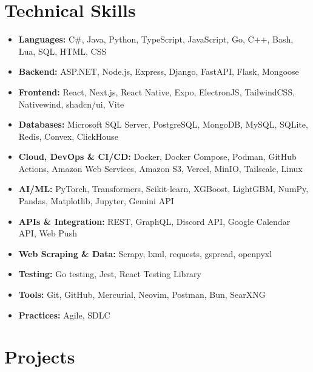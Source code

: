 \documentclass[a4paper,11pt]{article}
\begin{document}
\section*{Technical Skills}
\begin{itemize}
\item \textbf{Languages:} C\#, Java, Python, TypeScript, JavaScript, Go, C++, Bash, Lua, SQL, HTML, CSS
\item \textbf{Backend:} ASP.NET, Node.js, Express, Django, FastAPI, Flask, Mongoose
\item \textbf{Frontend:} React, Next.js, React Native, Expo, ElectronJS, TailwindCSS, Nativewind, shadcn/ui, Vite
\item \textbf{Databases:} Microsoft SQL Server, PostgreSQL, MongoDB, MySQL, SQLite, Redis, Convex, ClickHouse
\item \textbf{Cloud, DevOps \& CI/CD:} Docker, Docker Compose, Podman, GitHub Actions, Amazon Web Services, Amazon S3, Vercel, MinIO, Tailscale, Linux
\item \textbf{AI/ML:} PyTorch, Transformers, Scikit-learn, XGBoost, LightGBM, NumPy, Pandas, Matplotlib, Jupyter, Gemini API
\item \textbf{APIs \& Integration:} REST, GraphQL, Discord API, Google Calendar API, Web Push
\item \textbf{Web Scraping \& Data:} Scrapy, lxml, requests, gspread, openpyxl
\item \textbf{Testing:} Go testing, Jest, React Testing Library
\item \textbf{Tools:} Git, GitHub, Mercurial, Neovim, Postman, Bun, SearXNG
\item \textbf{Practices:} Agile, SDLC
\end{itemize}


\section*{Projects}
\end{document}
